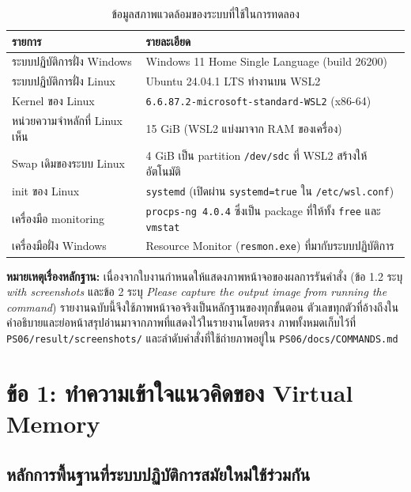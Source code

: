 \documentclass[a4paper,11pt]{article}
\newcommand{\code}[1]{\texttt{#1}}
\begin{document}
\begin{table}[H]
\centering\small
\caption{ข้อมูลสภาพแวดล้อมของระบบที่ใช้ในการทดลอง}
\begin{tabular}{@{}p{3.9cm}p{12.2cm}@{}}
\toprule
\textbf{รายการ} & \textbf{รายละเอียด} \\
\midrule
ระบบปฏิบัติการฝั่ง Windows & Windows 11 Home Single Language (build 26200) \\
ระบบปฏิบัติการฝั่ง Linux & Ubuntu 24.04.1 LTS ทำงานบน WSL2 \\
Kernel ของ Linux & \code{6.6.87.2-microsoft-standard-WSL2} (x86-64) \\
หน่วยความจำหลักที่ Linux เห็น & 15 GiB (WSL2 แบ่งมาจาก RAM ของเครื่อง) \\
Swap เดิมของระบบ Linux & 4 GiB เป็น partition \code{/dev/sdc} ที่ WSL2 สร้างให้อัตโนมัติ \\
init ของ Linux & \code{systemd} (เปิดผ่าน \code{systemd=true} ใน \code{/etc/wsl.conf}) \\
เครื่องมือ monitoring & \code{procps-ng 4.0.4} ซึ่งเป็น package ที่ให้ทั้ง \code{free} และ \code{vmstat} \\
เครื่องมือฝั่ง Windows & Resource Monitor (\code{resmon.exe}) ที่มากับระบบปฏิบัติการ \\
\bottomrule
\end{tabular}
\end{table}

\textbf{หมายเหตุเรื่องหลักฐาน:} เนื่องจากใบงานกำหนดให้แสดงภาพหน้าจอของผลการรันคำสั่ง (ข้อ 1.2 ระบุ \textit{with screenshots} และข้อ 2 ระบุ \textit{Please capture the output image from running the command}) รายงานฉบับนี้จึงใช้ภาพหน้าจอจริงเป็นหลักฐานของทุกขั้นตอน ตัวเลขทุกตัวที่อ้างถึงในคำอธิบายและย่อหน้าสรุปอ่านมาจากภาพที่แสดงไว้ในรายงานโดยตรง ภาพทั้งหมดเก็บไว้ที่ \code{PS06/result/screenshots/} และลำดับคำสั่งที่ใช้ถ่ายภาพอยู่ใน \code{PS06/docs/COMMANDS.md}

\section{ข้อ 1: ทำความเข้าใจแนวคิดของ Virtual Memory}

\subsection{หลักการพื้นฐานที่ระบบปฏิบัติการสมัยใหม่ใช้ร่วมกัน}
\end{document}
